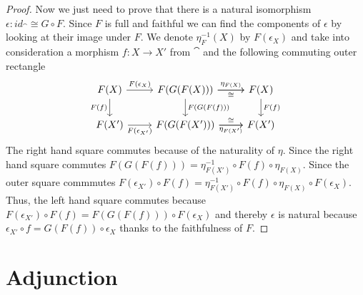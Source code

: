 \begin{proof}
Now we just need to prove that there is a natural isomorphism $\epsilon:id_\cat\cong G\circ F$. Since $F$ is full and faithful we can find the components of $\epsilon$ by looking at their image under $F$. We denote $\eta^{-1}_F(X)$ by $F(\epsilon_X)$ and take into consideration a morphism $f:X\to X'$ from $\cat$ and the following commuting outer rectangle
\[\begin{tikzcd}
    {F(X)} & {F(G(F(X)))} & {F(X)} \\
    {F(X')} & {F(G(F(X')))} & {F(X')}
    \arrow["{F(\epsilon_X)}", from=1-1, to=1-2]
    \arrow["{F(f)}"', from=1-1, to=2-1]
    \arrow["{F(\epsilon_{X'})}"', from=2-1, to=2-2]
    \arrow["{F(G(F(f)))}", from=1-2, to=2-2]
    \arrow["{\eta_{F(X)}}", from=1-2, to=1-3]
    \arrow["{F(f)}", from=1-3, to=2-3]
    \arrow["{\eta_{F(X')}}"', from=2-2, to=2-3]
    \arrow["\cong", from=2-2, to=2-3]
    \arrow["\cong"', from=1-2, to=1-3]
\end{tikzcd}\]
The right hand square commutes because of the naturality of $\eta$. Since the right hand square commutes $F(G(F(f)))=\eta^{-1}_{F(X')}\circ F(f)\circ \eta_{F(X)}$. Since the outer square commmutes $F(\epsilon_{X'})\circ F(f)=\eta^{-1}_{F(X')}\circ F(f)\circ \eta_{F(X)}\circ F(\epsilon_X)$. Thus, the left hand square commutes because $F(\epsilon_{X'})\circ F(f)=F(G(F(f)))\circ F(\epsilon_X)$ and thereby $\epsilon$ is natural because $\epsilon_{X'}\circ f=G(F(f))\circ \epsilon_X$ thanks to the faithfulness of $F$.
\end{proof}

\section{Adjunction \extra} %
\label{sub:adjunction}

